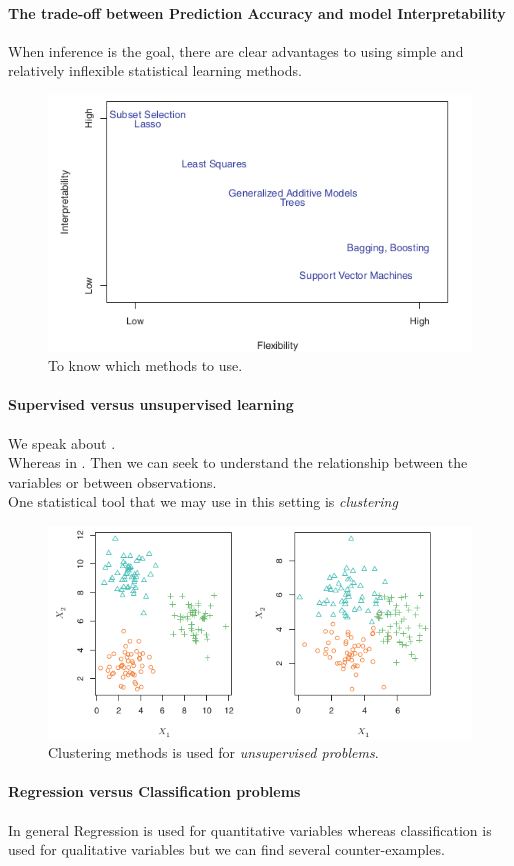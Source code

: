 \paragraph{The trade-off between Prediction Accuracy and model
Interpretability}
When inference is the goal, there are clear advantages to using simple
and relatively inflexible statistical learning methods.
\begin{figure}[H]
   \centering
   \includegraphics[width=.7\textwidth]{./chap/1chap/1sec/1images/1_5ToChooseAgoodApproach.png}
   \caption{To know which methods to use.}
   \label{fig:1.4}
 \end{figure}
 \paragraph{Supervised versus unsupervised learning}
 We speak about  .\\
 Whereas in  . Then we can
 seek to understand the relationship between the variables or between
 observations.\\ One statistical tool that we may use in this setting
 is \emph{clustering}
 \begin{figure}[H]
   \centering
   \includegraphics[width=.7\textwidth]{./chap/1chap/1sec/1images/1_6Clustering.png}
   \caption{Clustering methods is used for \emph{unsupervised problems}.}
   \label{fig:1.5}
 \end{figure}
 \paragraph{Regression versus Classification problems}
 In general Regression is used for quantitative variables whereas
 classification is used for qualitative variables but we can find
 several counter-examples.
